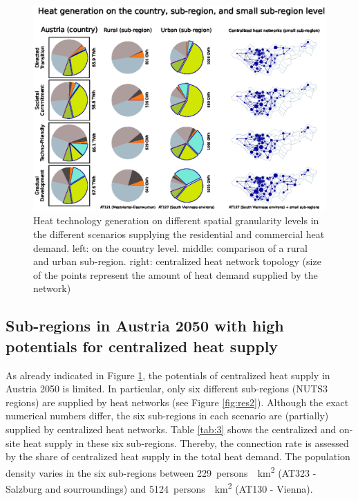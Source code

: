 \begin{figure}
	\centering
	\includegraphics[width=1\linewidth]{figures/4_Results/Spatial_results.eps}
	\caption{Heat technology generation on different spatial granularity levels in the different scenarios supplying the residential and commercial heat demand. left: on the country level. middle: comparison of a rural and urban sub-region. right: centralized heat network topology (size of the points represent the amount of heat demand supplied by the network)}
	\label{fig:res1}
\end{figure}

\subsection{Sub-regions in Austria 2050 with high potentials for centralized heat supply}\label{res:3}
As already indicated in Figure \ref{fig:res1}, the potentials of centralized heat supply in Austria 2050 is limited. In particular, only six different sub-regions (NUTS3 regions) are supplied by heat networks (see Figure \ref{fig:res2}). Although the exact numerical numbers differ, the six sub-regions in each scenario are (partially) supplied by centralized heat networks. Table \ref{tab:3} shows the centralized and on-site heat supply in these six sub-regions. Thereby, the connection rate is assessed by the share of centralized heat supply in the total heat demand. The population density varies in the six sub-regions between \SI{229}{persons \per \kilo\metre^2} (AT323 - Salzburg and sourroundings) and \SI{5124}{persons \per \kilo\metre^2} (AT130 - Vienna).

